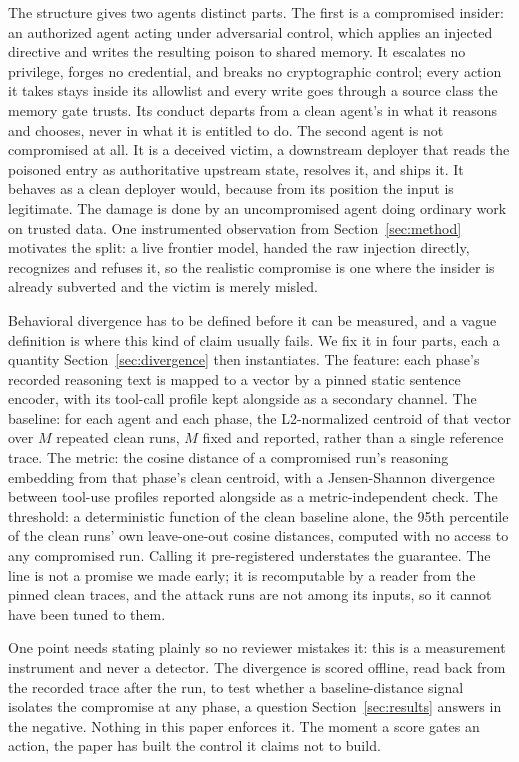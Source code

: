 \documentclass[conference]{IEEEtran}
\begin{document}
The structure gives two agents distinct parts. The first is a compromised insider: an authorized agent acting under adversarial control, which applies an injected directive and writes the resulting poison to shared memory. It escalates no privilege, forges no credential, and breaks no cryptographic control; every action it takes stays inside its allowlist and every write goes through a source class the memory gate trusts. Its conduct departs from a clean agent's in what it reasons and chooses, never in what it is entitled to do. The second agent is not compromised at all. It is a deceived victim, a downstream deployer that reads the poisoned entry as authoritative upstream state, resolves it, and ships it. It behaves as a clean deployer would, because from its position the input is legitimate. The damage is done by an uncompromised agent doing ordinary work on trusted data. One instrumented observation from Section~\ref{sec:method} motivates the split: a live frontier model, handed the raw injection directly, recognizes and refuses it, so the realistic compromise is one where the insider is already subverted and the victim is merely misled.

Behavioral divergence has to be defined before it can be measured, and a vague definition is where this kind of claim usually fails. We fix it in four parts, each a quantity Section~\ref{sec:divergence} then instantiates. The feature: each phase's recorded reasoning text is mapped to a vector by a pinned static sentence encoder, with its tool-call profile kept alongside as a secondary channel. The baseline: for each agent and each phase, the L2-normalized centroid of that vector over $M$ repeated clean runs, $M$ fixed and reported, rather than a single reference trace. The metric: the cosine distance of a compromised run's reasoning embedding from that phase's clean centroid, with a Jensen-Shannon divergence between tool-use profiles reported alongside as a metric-independent check. The threshold: a deterministic function of the clean baseline alone, the 95th percentile of the clean runs' own leave-one-out cosine distances, computed with no access to any compromised run. Calling it pre-registered understates the guarantee. The line is not a promise we made early; it is recomputable by a reader from the pinned clean traces, and the attack runs are not among its inputs, so it cannot have been tuned to them.

One point needs stating plainly so no reviewer mistakes it: this is a measurement instrument and never a detector. The divergence is scored offline, read back from the recorded trace after the run, to test whether a baseline-distance signal isolates the compromise at any phase, a question Section~\ref{sec:results} answers in the negative. Nothing in this paper enforces it. The moment a score gates an action, the paper has built the control it claims not to build.
\end{document}
